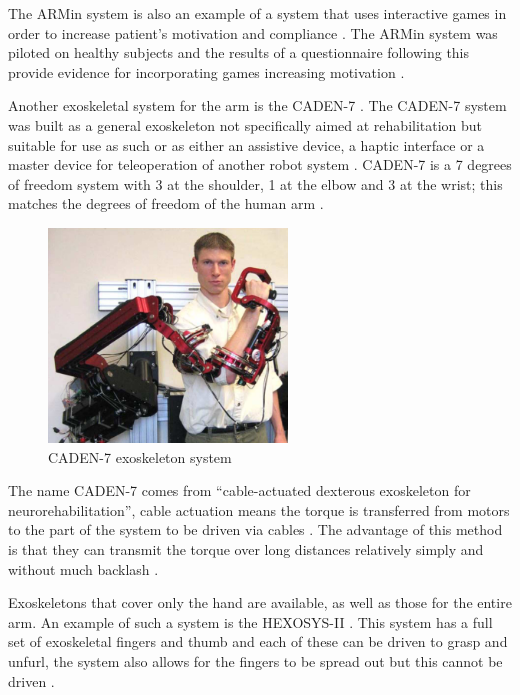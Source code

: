 \documentclass[journal]{IEEEtran}
\begin{document}
The ARMin system is also an example of a system that uses interactive games in order to increase 
patient's motivation and compliance \cite{ADLVE,ARMin}. The ARMin system was piloted on healthy subjects and 
the results of a questionnaire following this provide evidence for incorporating games increasing 
motivation \cite{ARMin}.

Another exoskeletal system for the arm is the CADEN-7 \cite{CADEN}. The CADEN-7 system was built as a 
general exoskeleton not specifically aimed at rehabilitation but suitable for use as such or as either an 
assistive device, a haptic interface or a master device for teleoperation of another robot system \cite{CADEN}. 
CADEN-7 is a 7 degrees of freedom system with 3 at the shoulder, 1 at the elbow and 3 at the wrist; this 
matches the degrees of freedom of the human arm \cite{CADEN}.

\begin{figure}[!h]
\centering
\includegraphics[width=2.5in]{CADEN7.png}
\caption{CADEN-7 exoskeleton system \cite{CADEN}}
\label{CADEN7_fig}
\end{figure}

The name CADEN-7 comes from ``cable-actuated dexterous exoskeleton for neurorehabilitation'', 
cable actuation means the torque is transferred from motors to the part of the system to be driven 
via cables \cite{CADEN}. The advantage of this method is that they can transmit the torque over long 
distances relatively simply and without much backlash \cite{CADEN}.

Exoskeletons that cover only the hand are available, as well as those for the entire arm. An example of such a 
system is the HEXOSYS-II \cite{HandExo}. This system has a full set of exoskeletal fingers and thumb and 
each of these can be driven to grasp and unfurl, the system also allows for the fingers to be 
spread out but this cannot be driven \cite{HandExo}.
\end{document}
